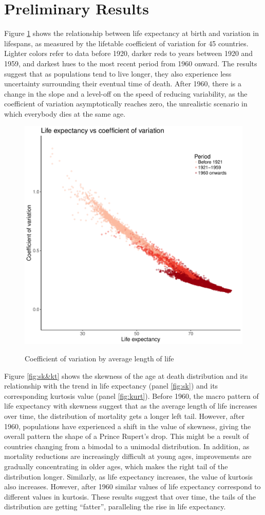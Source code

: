 \documentclass{article}
\begin{document}
\FloatBarrier
\section*{Preliminary Results}
Figure \ref{fig:CV} shows the relationship between life expectancy at birth and 
variation in lifespans, as measured by the lifetable coefficient of variation
for 45 countries. Lighter colors refer to data before 1920, darker reds to years between 1920 and 1959, and darkest hues to the most recent period from 1960 onward. The results suggest that as populations tend to live longer, they also experience less uncertainty surrounding their eventual time of death. After 1960, there is a change in the slope and a level-off on the speed of reducing variability, as the coefficient of variation asymptotically reaches zero, the unrealistic scenario in which everybody dies at the same age.
\begin{figure}
\caption{Coefficient of variation by average length of life}
\centering
\includegraphics[width=.3\textwidth]{Figure_CV}
\label{fig:CV}
\end{figure}

Figure \ref{fig:sk&kt} shows the skewness of the age at death distribution and
its relationship with the trend in life expectancy (panel \ref{fig:sk}) and
its corresponding kurtosis value (panel \ref{fig:kurt}). Before 1960, the macro
pattern of life expectancy with skewness suggest that as the average length of
life increases over time, the distribution of mortality gets a longer left tail.
However, after 1960, populations have experienced a shift in the value
of skewness, giving the overall pattern the shape of a Prince Rupert's drop. This
might be a result of countries changing from a bimodal to a unimodal
distribution. In addition, as mortality reductions are increasingly difficult at
young ages, improvements are gradually concentrating in older ages, which makes
the right tail of the distribution longer. Similarly, as life expectancy increases, the value of kurtosis also increases. However, after 1960 similar values of life expectancy correspond to different values in kurtosis. These results suggest that over time, the tails of the distribution are getting ``fatter'', paralleling the rise in life expectancy.
\end{document}

